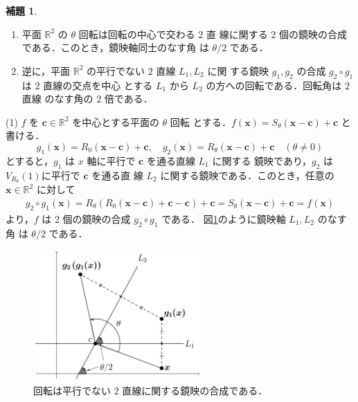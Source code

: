 \documentclass[11pt, uplatex, dvipdfmx, titlepage]{jsarticle}
\makeatletter
\renewenvironment{proof}[1][\proofname]{\par
  \pushQED{\qed}%
  \normalfont \topsep6\p@\@plus6\p@\relax
  \trivlist
  \item[\hskip\labelsep
         \bfseries
    {#1}]\ignorespaces
}{%
  \popQED\endtrivlist\@endpefalse
}
\theoremstyle{definition}
\newtheorem{lemma}{補題}[section]
\renewcommand{\proofname}{\textbf{証明}}
\makeatother
\begin{document}
\begin{lemma}\label{lem:rotaion2ref}
  \begin{enumerate}[(1)]
  \item 平面 $\mathbb{R}^2$ の $\theta$ 回転は回転の中心で交わる $2$ 直
    線に関する $2$ 個の鏡映の合成である．このとき，鏡映軸同士のなす角
    は $\theta/2$ である．

  \item 逆に，平面 $\mathbb{R}^2$ の平行でない $2$ 直線 $L_1, L_2$ に関
    する鏡映 $g_1, g_2$ の合成 $g_2 \circ g_1$ は $2$ 直線の交点を中心
    とする $L_1$ から $L_2$ の方への回転である．回転角は $2$ 直線
    のなす角の $2$ 倍である．
  \end{enumerate}
\end{lemma}

\begin{proof}
  (1) $f$ を $\bm{c} \in \mathbb{R}^2$ を中心とする平面の $\theta$ 回転
  とする．$f(\bm{x}) = S_{\theta}(\bm{x}-\bm{c})+\bm{c}$ と書ける．
  \[
    g_1(\bm{x})=R_0(\bm{x}-\bm{c})+\bm{c}, \quad g_2 (\bm{x}) = R_{\theta}(\bm{x}-\bm{c})+\bm{c}
    \quad (\theta \neq 0)
  \]
  とすると，$g_1$ は $x$ 軸に平行で $\bm{c}$ を通る直線 $L_1$ に関する
  鏡映であり，$g_2$ は $V_{R_{\theta}}(1)$に平行で $\bm{c}$ を通る直
  線 $L_2$ に関する鏡映である．このとき，任意の $\bm{x} \in
  \mathbb{R}^2$ に対して
  \begin{align*}
    g_2 \circ g_1(\bm{x}) = R_{\theta}\left( R_{0}(\bm{x}-\bm{c}) + \bm{c} - \bm{c} \right) + \bm{c}
    = S_{\theta} (\bm{x}-\bm{c}) +\bm{c} = f(\bm{x})
  \end{align*}
  より，$f$ は $2$ 個の鏡映の合成 $g_2 \circ g_1$ である．
  図\ref{fig:rotation2ref}のように鏡映軸 $L_1, L_2$ のなす角
  は $\theta/2$ である．
  \begin{figure}[h]
    \centering
    \includegraphics[height=5cm]{pictures/rotation2ref.pdf}
    \caption{回転は平行でない $2$ 直線に関する鏡映の合成である．}\label{fig:rotation2ref}
  \end{figure}


\end{proof}
\end{document}
